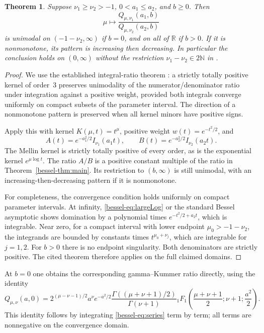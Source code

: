 \documentclass[11pt,a4paper]{article}
\newtheorem{theorem}{Theorem}[section]
\theoremstyle{remark}\newtheorem{remark}[theorem]{Remark}
\newcommand{\R}{\mathbb R}
\numberwithin{equation}{section}
\begin{document}
\begin{theorem}\label{bessel-thm:Q}
Suppose $\nu_1\ge\nu_2>-1$, $0<a_1\le a_2$, and $b\ge0$.
Then
\[
 \mu\longmapsto
 \frac{Q_{\mu,\nu_1}(a_1,b)}{Q_{\mu,\nu_2}(a_2,b)}
\]
is unimodal on $(-1-\nu_2,\infty)$ if $b=0$, and on all of
$\R$ if $b>0$. If it is nonmonotone, its pattern is increasing
then decreasing. In particular the conclusion holds on $(0,\infty)$
without the restriction $\nu_1-\nu_2\in2\mathbb N$ in
\cite[Theorem~4.3]{bessel-KVZ}.
\end{theorem}
\begin{proof}
We use the established integral-ratio theorem
\cite[Theorem~2.6 and Example~1]{bessel-KVZ}: a strictly totally positive
kernel of order~3 preserves unimodality of the numerator/denominator
ratio under integration against a positive weight, provided both
integrals converge uniformly on compact subsets of the parameter
interval. The direction of a nonmonotone pattern is preserved when
all kernel minors have positive signs.

Apply this with kernel $K(\mu,t)=t^\mu$, positive weight
$w(t)=e^{-t^2/2}$, and
\[
 A(t)=e^{-a_1^2/2}I_{\nu_1}(a_1t),\qquad
 B(t)=e^{-a_2^2/2}I_{\nu_2}(a_2t).
\]
The Mellin kernel is strictly totally positive of every order, as
is the exponential kernel $e^{\mu\log t}$.
The ratio $A/B$ is a positive constant multiple of the ratio in
Theorem~\ref{bessel-thm:main}. Its restriction to $(b,\infty)$ is still
unimodal, with an increasing-then-decreasing pattern if it is
nonmonotone.

For completeness, the convergence condition holds uniformly on compact
parameter intervals. At infinity, \eqref{bessel-eq:largeLog} or the standard
Bessel asymptotic shows domination by a polynomial times
$e^{-t^2/2+a_2t}$, which is integrable. Near zero, for a compact
interval with lower endpoint $\mu_0>-1-\nu_2$, the integrands
are bounded by constants times $t^{\mu_0+\nu_j}$, which are
integrable for $j=1,2$. For $b>0$ there is no endpoint singularity.
Both denominators are strictly positive. The cited theorem therefore
applies on the full claimed domains.
\end{proof}

At $b=0$ one obtains the corresponding gamma--Kummer ratio directly,
using the identity
\[
 Q_{\mu,\nu}(a,0)=2^{(\mu-\nu-1)/2}a^\nu e^{-a^2/2}
 \frac{\Gamma((\mu+\nu+1)/2)}{\Gamma(\nu+1)}
 {}_1F_1\left(\frac{\mu+\nu+1}{2};\nu+1;\frac{a^2}{2}\right).
\]
This identity follows by integrating \eqref{bessel-eq:series} term by term;
all terms are nonnegative on the convergence domain.
\end{document}
